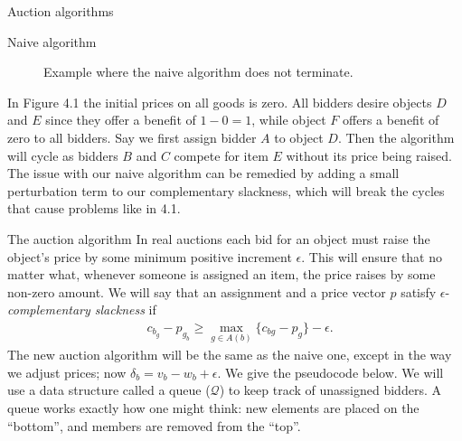 \begin{section}{Auction algorithms}
\begin{subsection}{Naive algorithm}
\begin{figure}[h]
			\caption{Example where the naive algorithm does not terminate.} 
		\end{figure}
		In Figure 4.1 the initial prices on all goods is zero. All bidders desire objects 
		$D$ and $E$ since they offer a benefit of $1-0 = 1$, while object $F$ offers a benefit 
		of zero to all bidders. Say we first assign bidder $A$ to object $D$. Then the algorithm 
		will cycle as bidders $B$ and $C$ compete for item $E$ without its price being raised.\\
		The issue with our naive algorithm can be remedied by adding a small perturbation term 
		to our complementary slackness, which will break the cycles that cause problems like in 
		4.1.
	\end{subsection}
	\begin{subsection}{The auction algorithm}
		In real auctions each bid for an object must raise the object's price by some minimum 
		positive increment $\epsilon$. This will ensure that no matter what, whenever someone 
		is assigned an item, the price raises by some non-zero amount. We will say that 
		an assignment and a price vector $p$ satisfy $\epsilon$-\emph{complementary slackness} 
		if 
		\begin{align}
			& c_{b_g} - p_{g_b} \geq \max_{g\in A(b)} \{c_{bg} - p_g\} - \epsilon.
		\end{align}
		The new auction algorithm will be the same as the naive one, except in the way we 
		adjust prices; now $\delta_b = v_b - w_b + \epsilon$. We give the pseudocode below. We 
		will use a data structure called a queue ($\mathcal{Q}$) to keep track of unassigned 
		bidders. A queue works exactly how one might think: new elements are placed on the 
		``bottom'', and members are removed from the ``top''.

\end{subsection}
\end{section}
